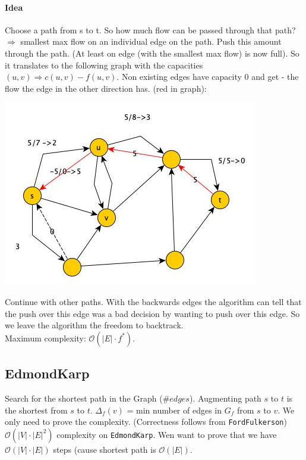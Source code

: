 \paragraph{Idea} Choose a path from s to t. So how much flow can be passed through that path? $\Rightarrow$ smallest max flow on an individual edge on the path. Push this amount through the path. (At least on edge (with the smallest max flow) is now full). So it translates to the following graph with the capacities $ (u,v) \Rightarrow c(u,v)-f(u,v)$. Non existing edges have capacity 0 and get - the flow the edge in the other direction has. (red in graph): 
\begin{center}
\includegraphics[scale=0.5]{img/graph15} 
\end{center}
Continue with other paths. With the backwards edges the algorithm can tell that the push over this edge was a bad decision by wanting to push over this edge. So we leave the algorithm the freedom to backtrack. \\
Maximum complexity: $\mathcal{O}(|E|\cdot f^*)$. 
\subsection{EdmondKarp}
Search for the shortest path in the Graph ($\#edges$). Augmenting path $s$ to $t$ is the shortest from $s$ to $t$. $\Delta_f(v)$ = min number of edges in $G_f$ from $s$ to $v$. We only need to prove the complexity. (Correctness follows from \texttt{FordFulkerson}) \\
$\mathcal{O}(|V|\cdot |E|^2)$ complexity on \texttt{EdmondKarp}. Wen want to prove that we have $\mathcal{O}(|V|\cdot |E|)$ steps (cause shortest path is $\mathcal{O}(|E|)$.

